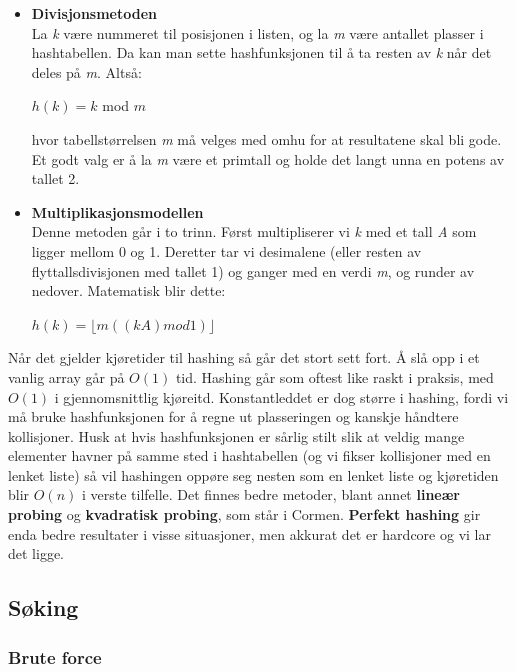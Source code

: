 \begin{itemize}
    \item \textbf{Divisjonsmetoden}\\
La \textit{k} være nummeret til posisjonen i listen, og la \textit{m} være antallet plasser i hashtabellen. Da kan man sette hashfunksjonen til å ta resten av \textit{k} når det deles på \textit{m}. Altså:
\begin{center}
$h(k) = k$ mod $m$
\end{center}
hvor tabellstørrelsen \textit{m} må velges med omhu for at resultatene skal bli gode. Et godt valg er å la \textit{m} være et primtall og holde det langt unna en potens av tallet 2.
\item \textbf{Multiplikasjonsmodellen}\\
Denne metoden går i to trinn. Først multipliserer vi \textit{k} med et tall \textit{A} som ligger mellom 0 og 1. Deretter tar vi desimalene (eller resten av flyttallsdivisjonen med tallet 1) og ganger med en verdi \textit{m}, og runder av nedover. Matematisk blir dette:
\begin{center}
$h(k) = \lfloor m((kA) mod 1) \rfloor$
\end{center}
 \end{itemize}

\noindent Når det gjelder kjøretider til hashing så går det stort sett fort. Å slå opp i et vanlig array går på $O(1)$ tid. Hashing går som oftest like raskt i praksis, med $O(1)$ i gjennomsnittlig kjøreitd. Konstantleddet er dog større i hashing, fordi vi må bruke hashfunksjonen for å regne ut plasseringen og kanskje håndtere kollisjoner. Husk at hvis hashfunksjonen er sårlig stilt slik at veldig mange elementer havner på samme sted i hashtabellen (og vi fikser kollisjoner med en lenket liste) så vil hashingen oppøre seg nesten som en lenket liste og kjøretiden blir $O(n)$ i verste tilfelle. Det finnes bedre metoder, blant annet \textbf{lineær probing} og \textbf{kvadratisk probing}, som står i Cormen. \textbf{Perfekt hashing} gir enda bedre resultater i visse situasjoner, men akkurat det er hardcore og vi lar det ligge.

 
\subsection{Søking}

\subsubsection{Brute force}

